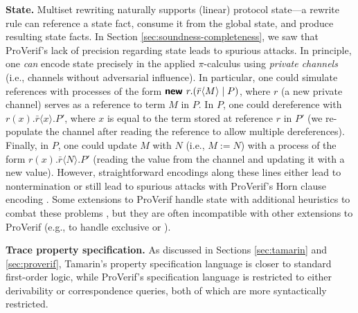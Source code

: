 \documentclass{article}
\theoremstyle{definition}
\begin{document}
\textbf{State.} Multiset rewriting naturally supports (linear) protocol state---a rewrite rule can reference a state fact, 
consume it from the global state, and produce resulting state facts. 
In Section \ref{sec:soundness-completeness}, we saw that ProVerif's lack of precision regarding state 
leads to spurious attacks. 
In principle, one \emph{can} encode state precisely in the applied $\pi$-calculus using \emph{private channels} 
(i.e., channels without adversarial influence). 
In particular, one could simulate references with processes of the form $\textbf{\textsf{new }}r. 
(\bar{r}\langle M \rangle \mid P)$, where $r$ (a new private channel) serves as a reference to term $M$ in $P$. 
In $P$, one could dereference with $r(x). \bar{r}\langle x\rangle. P'$, 
where $x$ is equal to the term stored at reference $r$ in $P'$ 
(we re-populate the channel after reading the reference to allow multiple dereferences). 
Finally, in $P$, one could update $M$ with $N$ (i.e., $M := N$) with a process of the form 
$r(x).\bar{r}\langle N\rangle.P'$ (reading the value from the channel and updating it with a new value). 
However, straightforward encodings along these lines either lead to nontermination 
or still lead to spurious attacks with ProVerif's Horn clause encoding \cite{statverif}. 
Some extensions to ProVerif handle state with additional heuristics to combat these problems \cite{gsverif,statverif}, 
but they are often incompatible with other extensions to ProVerif (e.g., to handle exclusive or \cite{proverif_xor}).

\textbf{Trace property specification.} 
As discussed in Sections \ref{sec:tamarin} and \ref{sec:proverif}, Tamarin's property specification language is closer 
to standard first-order logic, while ProVerif's specification language is restricted to either derivability 
or correspondence queries, both of which are more syntactically restricted. 




\end{document}

